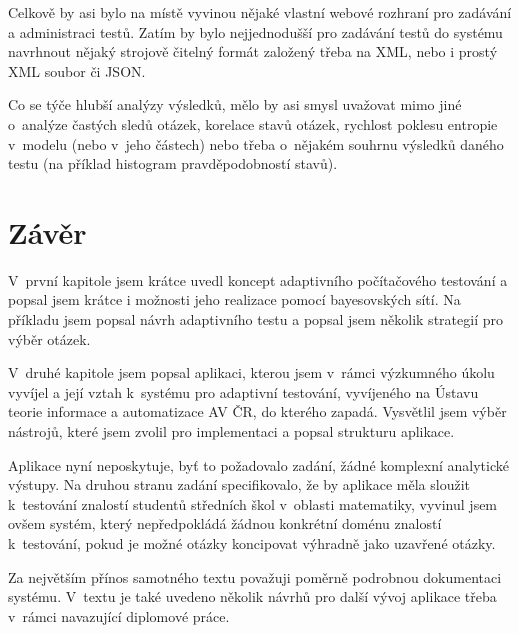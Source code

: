 \documentclass[a4paper,twoside,12pt]{scrbook}
\begin{document}
Celkově by asi bylo na místě vyvinou nějaké vlastní webové rozhraní pro zadávání a administraci testů. Zatím by bylo nejjednodušší pro zadávání testů do systému navrhnout nějaký strojově čitelný formát založený třeba na XML, nebo i prostý XML soubor či JSON.

Co se týče hlubší analýzy výsledků, mělo by asi smysl uvažovat mimo jiné o~analýze častých sledů otázek, korelace stavů otázek, rychlost poklesu entropie v~modelu (nebo v~jeho částech) nebo třeba o~nějakém souhrnu výsledků daného testu (na příklad histogram pravděpodobností stavů).

\chapter*{Závěr} %

V~první kapitole jsem krátce uvedl koncept adaptivního počítačového testování a popsal jsem krátce i možnosti jeho realizace pomocí bayesovských sítí. Na příkladu jsem popsal návrh adaptivního testu a popsal jsem několik strategií pro výběr otázek.

V~druhé kapitole jsem popsal aplikaci, kterou jsem v~rámci výzkumného úkolu vyvíjel a její vztah k~systému pro adaptivní testování, vyvíjeného na Ústavu teorie informace a automatizace AV ČR, do kterého zapadá. Vysvětlil jsem výběr nástrojů, které jsem zvolil pro implementaci a popsal strukturu aplikace.

Aplikace nyní neposkytuje, byť to požadovalo zadání, žádné komplexní analytické výstupy. Na druhou stranu zadání specifikovalo, že by aplikace měla sloužit k~testování znalostí studentů středních škol v~oblasti matematiky, vyvinul jsem ovšem systém, který nepředpokládá žádnou konkrétní doménu znalostí k~testování, pokud je možné otázky koncipovat výhradně jako uzavřené otázky.

Za největším přínos samotného textu považuji poměrně podrobnou dokumentaci systému. V~textu je také uvedeno několik návrhů pro další vývoj aplikace třeba v~rámci navazující diplomové práce.

%
%


\clearpage  %
\end{document}
